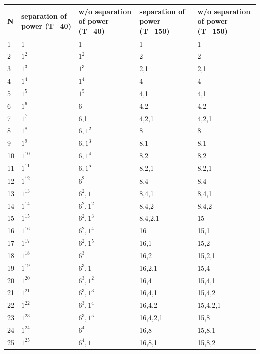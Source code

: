 \begin{tabular}{lllll}
\toprule
N & separation of power (T=40) & w/o separation of power (T=40) & separation of power (T=150) & w/o separation of power (T=150) \\
\midrule
1 & 1 & 1 & 1 & 1 \\
2 & $1^2$ & $1^2$ & 2 & 2 \\
3 & $1^3$ & $1^3$ & 2,1 & 2,1 \\
4 & $1^4$ & $1^4$ & 4 & 4 \\
5 & $1^5$ & $1^5$ & 4,1 & 4,1 \\
6 & $1^6$ & 6 & 4,2 & 4,2 \\
7 & $1^7$ & 6,1 & 4,2,1 & 4,2,1 \\
8 & $1^8$ & $6,1^2$ & 8 & 8 \\
9 & $1^9$ & $6,1^3$ & 8,1 & 8,1 \\
10 & $1^10$ & $6,1^4$ & 8,2 & 8,2 \\
11 & $1^11$ & $6,1^5$ & 8,2,1 & 8,2,1 \\
12 & $1^12$ & $6^2$ & 8,4 & 8,4 \\
13 & $1^13$ & $6^2,1$ & 8,4,1 & 8,4,1 \\
14 & $1^14$ & $6^2,1^2$ & 8,4,2 & 8,4,2 \\
15 & $1^15$ & $6^2,1^3$ & 8,4,2,1 & 15 \\
16 & $1^16$ & $6^2,1^4$ & 16 & 15,1 \\
17 & $1^17$ & $6^2,1^5$ & 16,1 & 15,2 \\
18 & $1^18$ & $6^3$ & 16,2 & 15,2,1 \\
19 & $1^19$ & $6^3,1$ & 16,2,1 & 15,4 \\
20 & $1^20$ & $6^3,1^2$ & 16,4 & 15,4,1 \\
21 & $1^21$ & $6^3,1^3$ & 16,4,1 & 15,4,2 \\
22 & $1^22$ & $6^3,1^4$ & 16,4,2 & 15,4,2,1 \\
23 & $1^23$ & $6^3,1^5$ & 16,4,2,1 & 15,8 \\
24 & $1^24$ & $6^4$ & 16,8 & 15,8,1 \\
25 & $1^25$ & $6^4,1$ & 16,8,1 & 15,8,2 \\
\bottomrule
\end{tabular}
